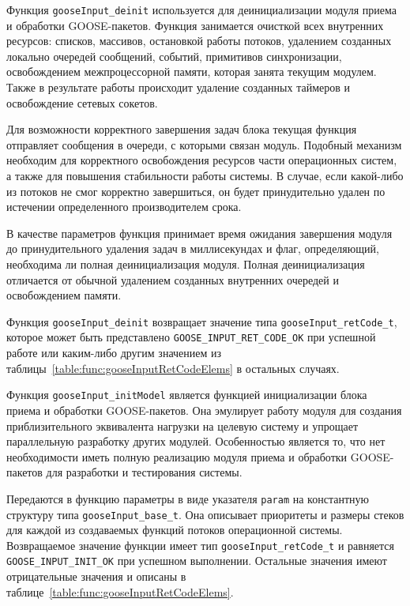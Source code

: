 Функция \lstinline{gooseInput_deinit} используется для деинициализации модуля приема и обработки GOOSE-пакетов. Функция занимается очисткой всех внутренних ресурсов:
списков, массивов, остановкой работы потоков, удалением созданных локально очередей сообщений, событий, примитивов синхронизации, освобождением межпроцессорной памяти, которая занята текущим модулем.
Также в результате работы происходит удаление созданных таймеров и освобождение
сетевых сокетов.

Для возможности корректного завершения задач блока текущая
функция отправляет сообщения в очереди, с которыми связан модуль.
Подобный механизм необходим для корректного освобождения ресурсов части
операционных систем, а также для повышения стабильности работы системы.
В случае, если какой-либо из потоков не смог корректно завершиться,
он будет принудительно удален по истечении определенного производителем срока.

В качестве параметров функция принимает время ожидания завершения модуля до принудительного удаления задач в миллисекундах и флаг, определяющий, необходима ли полная деинициализация модуля. Полная деинициализация отличается от обычной удалением созданных внутренних очередей и освобождением памяти.

Функция \lstinline{gooseInput_deinit} возвращает значение типа \lstinline{gooseInput_retCode_t}, которое может быть представлено \lstinline{GOOSE_INPUT_RET_CODE_OK} при успешной работе или
каким-либо другим значением из таблицы~\ref{table:func:gooseInputRetCodeElems}
в остальных случаях.

Функция \lstinline{gooseInput_initModel} является функцией инициализации блока приема и обработки GOOSE-пакетов.
Она эмулирует работу модуля для создания приблизительного эквивалента нагрузки на
целевую систему и
упрощает параллельную разработку других модулей. Особенностью является то, что нет необходимости иметь полную реализацию модуля приема и обработки GOOSE-пакетов для разработки и тестирования системы.

Передаются в функцию параметры в виде указателя \lstinline{param} на константную структуру типа \lstinline{gooseInput_base_t}. Она описывает приоритеты и
размеры стеков для каждой из создаваемых функций потоков
операционной системы.
Возвращаемое значение функции имеет тип \lstinline{gooseInput_retCode_t} и равняется \lstinline{GOOSE_INPUT_INIT_OK} при успешном выполнении. Остальные значения
имеют отрицательные значения и описаны
в таблице~\ref{table:func:gooseInputRetCodeElems}.


